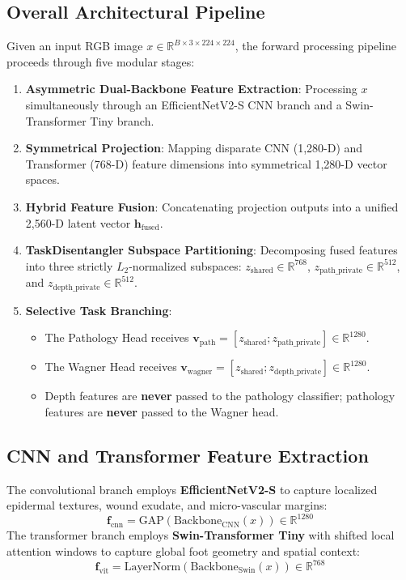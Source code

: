 \documentclass[journal]{IEEEtran}
\begin{document}
\subsection{Overall Architectural Pipeline}
Given an input RGB image $x \in \mathbb{R}^{B \times 3 \times 224 \times 224}$, the forward processing pipeline proceeds through five modular stages:
\begin{enumerate}
    \item \textbf{Asymmetric Dual-Backbone Feature Extraction}: Processing $x$ simultaneously through an EfficientNetV2-S CNN branch and a Swin-Transformer Tiny branch.
    \item \textbf{Symmetrical Projection}: Mapping disparate CNN (1,280-D) and Transformer (768-D) feature dimensions into symmetrical 1,280-D vector spaces.
    \item \textbf{Hybrid Feature Fusion}: Concatenating projection outputs into a unified 2,560-D latent vector $\mathbf{h}_{\text{fused}}$.
    \item \textbf{TaskDisentangler Subspace Partitioning}: Decomposing fused features into three strictly $L_2$-normalized subspaces: $z_{\text{shared}} \in \mathbb{R}^{768}$, $z_{\text{path\_private}} \in \mathbb{R}^{512}$, and $z_{\text{depth\_private}} \in \mathbb{R}^{512}$.
    \item \textbf{Selective Task Branching}:
    \begin{itemize}
        \item The Pathology Head receives $\mathbf{v}_{\text{path}} = [z_{\text{shared}}; z_{\text{path\_private}}] \in \mathbb{R}^{1280}$.
        \item The Wagner Head receives $\mathbf{v}_{\text{wagner}} = [z_{\text{shared}}; z_{\text{depth\_private}}] \in \mathbb{R}^{1280}$.
        \item Depth features are \textbf{never} passed to the pathology classifier; pathology features are \textbf{never} passed to the Wagner head.
    \end{itemize}
\end{enumerate}

\subsection{CNN and Transformer Feature Extraction}
The convolutional branch employs \textbf{EfficientNetV2-S} \cite{tan2021efficientnetv2} to capture localized epidermal textures, wound exudate, and micro-vascular margins:
\begin{equation}
    \mathbf{f}_{\text{cnn}} = \text{GAP}\left( \text{Backbone}_{\text{CNN}}(x) \right) \in \mathbb{R}^{1280}
\end{equation}
The transformer branch employs \textbf{Swin-Transformer Tiny} \cite{liu2021swin} with shifted local attention windows to capture global foot geometry and spatial context:
\begin{equation}
    \mathbf{f}_{\text{vit}} = \text{LayerNorm}\left( \text{Backbone}_{\text{Swin}}(x) \right) \in \mathbb{R}^{768}
\end{equation}
\end{document}
